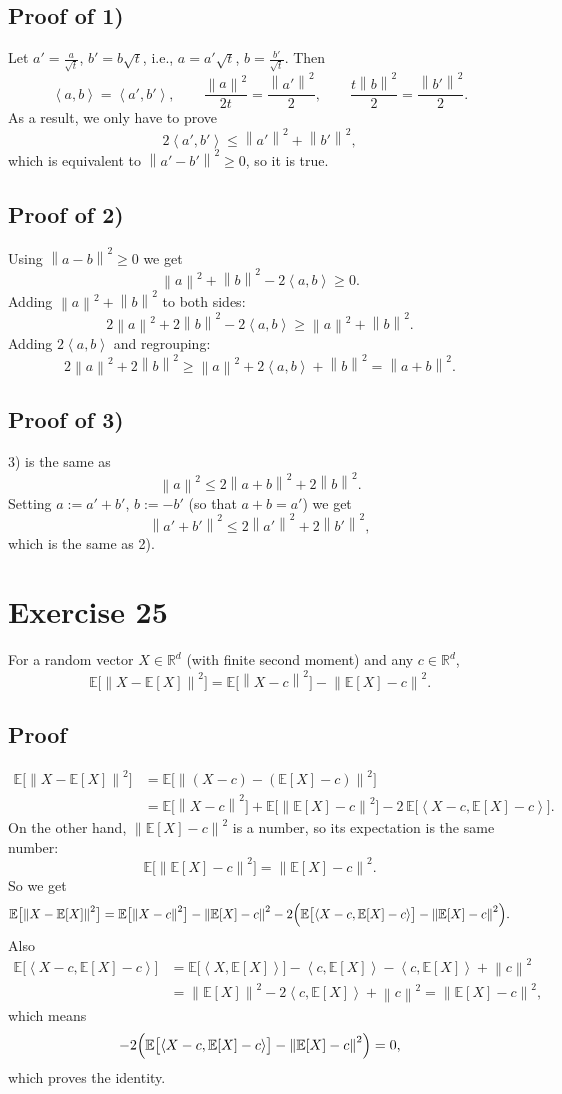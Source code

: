 \documentclass[11pt,a4paper]{article}
\newcommand{\R}{\mathbb{R}}
\newcommand{\E}{\mathbb{E}}
\newcommand{\norm}[1]{\left\| #1 \right\|}
\newcommand{\ip}[2]{\left\langle #1, #2 \right\rangle}
\begin{document}
\subsection*{Proof of 1)}
Let $a' = \frac{a}{\sqrt{t}}$, $b' = b\sqrt{t}$, i.e., $a = a'\sqrt{t}$, $b = \frac{b'}{\sqrt{t}}$. Then
\[
  \ip{a}{b} = \ip{a'}{b'}, \qquad
  \frac{\norm{a}^2}{2t} = \frac{\norm{a'}^2}{2}, \qquad
  \frac{t\norm{b}^2}{2} = \frac{\norm{b'}^2}{2}.
\]
As a result, we only have to prove
\[
  2\ip{a'}{b'} \le \norm{a'}^2 + \norm{b'}^2,
\]
which is equivalent to $\norm{a'-b'}^2 \ge 0$, so it is true.

\subsection*{Proof of 2)}
Using $\norm{a-b}^2 \ge 0$ we get
\[
  \norm{a}^2 + \norm{b}^2 - 2\ip{a}{b} \ge 0 .
\]
Adding $\norm{a}^2 + \norm{b}^2$ to both sides:
\[
  2\norm{a}^2 + 2\norm{b}^2 - 2\ip{a}{b} \ge \norm{a}^2 + \norm{b}^2 .
\]
Adding $2\ip{a}{b}$ and regrouping:
\[
  2\norm{a}^2 + 2\norm{b}^2 \ge \norm{a}^2 + 2\ip{a}{b} + \norm{b}^2 = \norm{a+b}^2 .
\]

\subsection*{Proof of 3)}
3) is the same as
\[
  \norm{a}^2 \le 2\norm{a+b}^2 + 2\norm{b}^2 .
\]
Setting $a := a' + b'$, $b := -b'$ (so that $a + b = a'$) we get
\[
  \norm{a'+b'}^2 \le 2\norm{a'}^2 + 2\norm{b'}^2,
\]
which is the same as 2).

\section*{Exercise 25}

For a random vector $X \in \R^d$ (with finite second moment) and any $c \in \R^d$,
\[
  \E\bigl[\norm{X - \E[X]}^2\bigr] = \E\bigl[\norm{X - c}^2\bigr] - \norm{\E[X] - c}^2 .
\]

\subsection*{Proof}
\begin{align*}
  \E\bigl[\norm{X - \E[X]}^2\bigr]
  &= \E\bigl[\norm{(X - c) - (\E[X] - c)}^2\bigr] \\
  &= \E\bigl[\norm{X - c}^2\bigr] + \E\bigl[\norm{\E[X] - c}^2\bigr]
     - 2\,\E\bigl[\ip{X-c}{\E[X]-c}\bigr].
\end{align*}
On the other hand, $\norm{\E[X] - c}^2$ is a number, so its expectation is the same number:
\[
  \E\bigl[\norm{\E[X] - c}^2\bigr] = \norm{\E[X] - c}^2 .
\]
So we get
\[
  \E\bigl[\norm{X - \E[X]}^2\bigr]
  = \E\bigl[\norm{X - c}^2\bigr] - \norm{\E[X] - c}^2
    - 2\Bigl(\E\bigl[\ip{X-c}{\E[X]-c}\bigr] - \norm{\E[X] - c}^2\Bigr).
\]
Also
\begin{align*}
  \E\bigl[\ip{X-c}{\E[X]-c}\bigr]
  &= \E\bigl[\ip{X}{\E[X]}\bigr] - \ip{c}{\E[X]} - \ip{c}{\E[X]} + \norm{c}^2 \\
  &= \norm{\E[X]}^2 - 2\ip{c}{\E[X]} + \norm{c}^2 = \norm{\E[X] - c}^2,
\end{align*}
which means
\[
  -2\Bigl(\E\bigl[\ip{X-c}{\E[X]-c}\bigr] - \norm{\E[X] - c}^2\Bigr) = 0,
\]
which proves the identity.
\end{document}
